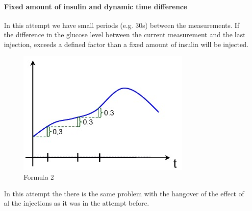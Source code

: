 \documentclass[pdflatex,a4paper,11pt,english]{scrreprt}
\begin{document}
\paragraph{Fixed amount of insulin and dynamic time difference}
In this attempt we have small periods (e.g. 30s) between the measurements. If the difference in the glucose level between the current measurement and the last injection, exceeds a defined factor than a fixed amount of insulin will be injected.
\begin{figure}[htb]
\centering
\includegraphics[width=\textwidth]{images/graf2.jpg}
\caption{Formula 2}
\label{fig:formula_2}
\end{figure}
In this attempt the there is the same problem with the hangover of the effect of al the injections as it was in the attempt before.
\end{document}
